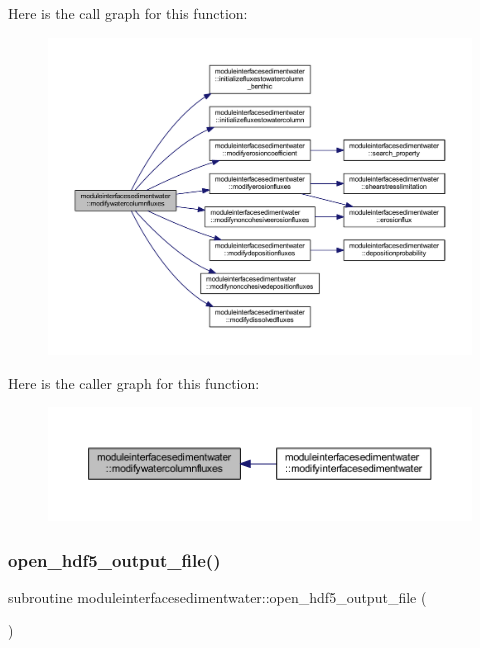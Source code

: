 Here is the call graph for this function\+:\nopagebreak
\begin{figure}[H]
\begin{center}
\leavevmode
\includegraphics[width=350pt]{namespacemoduleinterfacesedimentwater_a052aa500f3fe487c32cb93f8c5a8ea60_cgraph}
\end{center}
\end{figure}
Here is the caller graph for this function\+:\nopagebreak
\begin{figure}[H]
\begin{center}
\leavevmode
\includegraphics[width=350pt]{namespacemoduleinterfacesedimentwater_a052aa500f3fe487c32cb93f8c5a8ea60_icgraph}
\end{center}
\end{figure}
\mbox{\label{namespacemoduleinterfacesedimentwater_a4426ad3ca86030e07e39188a538bdca8}} 
\subsubsection{\texorpdfstring{open\+\_\+hdf5\+\_\+output\+\_\+file()}{open\_hdf5\_output\_file()}}
{\footnotesize\ttfamily subroutine moduleinterfacesedimentwater\+::open\+\_\+hdf5\+\_\+output\+\_\+file (\begin{DoxyParamCaption}{ }\end{DoxyParamCaption})\hspace{0.3cm}{\ttfamily [private]}}

